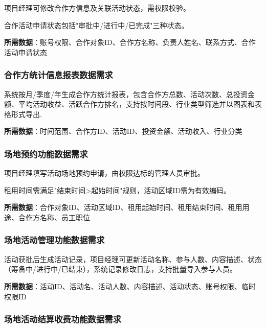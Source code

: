 \documentclass[]{article}
\begin{document}
项目经理可修改合作方信息及关联活动状态，需权限校验。

合作活动申请状态包括"审批中/进行中/已完成"三种状态。

\textbf{所需数据}：账号权限、合作对象ID、合作方名称、负责人姓名、联系方式、合作活动申请状态

\hypertarget{ux5408ux4f5cux65b9ux7edfux8ba1ux4fe1ux606fux62a5ux8868ux6570ux636eux9700ux6c42}{%
\subsubsection{合作方统计信息报表数据需求}\label{ux5408ux4f5cux65b9ux7edfux8ba1ux4fe1ux606fux62a5ux8868ux6570ux636eux9700ux6c42}}

系统按月/季度/年生成合作方统计报表，包含合作方总数、活动次数、总投资金额、平均活动收益、活跃合作方排名，支持按时间段、行业类型筛选并以图表和表格形式导出.

\textbf{所需数据}：时间范围、合作方ID、活动ID、投资金额、活动收入、行业分类

\hypertarget{ux573aux5730ux9884ux7ea6ux529fux80fdux6570ux636eux9700ux6c42}{%
\subsubsection{场地预约功能数据需求}\label{ux573aux5730ux9884ux7ea6ux529fux80fdux6570ux636eux9700ux6c42}}

项目经理填写活动场地预约申请，由权限达标的管理人员审批。

租用时间需满足"结束时间\textgreater{}起始时间"规则，活动区域ID需为有效编码。

\textbf{所需数据}：合作对象ID、活动区域ID、租用起始时间、租用结束时间、租用用途、合作方名称、员工职位

\hypertarget{ux573aux5730ux6d3bux52a8ux7ba1ux7406ux529fux80fdux6570ux636eux9700ux6c42}{%
\subsubsection{场地活动管理功能数据需求}\label{ux573aux5730ux6d3bux52a8ux7ba1ux7406ux529fux80fdux6570ux636eux9700ux6c42}}

活动获批后生成活动记录，项目经理可更新活动名称、参与人数、内容描述、状态（筹备中/进行中/已结束），系统记录修改日志，支持批量导入参与人员。

\textbf{所需数据}：活动ID、活动名、活动人数、内容描述、活动状态、账号权限、临时权限ID

\hypertarget{ux573aux5730ux6d3bux52a8ux7ed3ux7b97ux6536ux8d39ux529fux80fdux6570ux636eux9700ux6c42}{%
\subsubsection{场地活动结算收费功能数据需求}\label{ux573aux5730ux6d3bux52a8ux7ed3ux7b97ux6536ux8d39ux529fux80fdux6570ux636eux9700ux6c42}}
\end{document}
